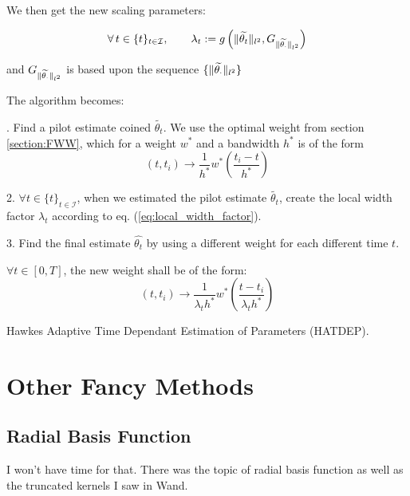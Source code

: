 \documentclass[11pt]{book}
\newcommand{\sequencetime}{\{t\}_{t \in \mathcal I} }
\begin{document}
We then get the new scaling parameters:


\begin{equation}
\forall t \in \sequencetime, \qquad \lambda_{t} :=  
g \left (\norm{\widetilde{\theta_{t}}}_{l^2}, 
G_{\norm{\widetilde{\theta_{\cdot}}}_{l^2}} \right)   
\end{equation}

and  $ G_{\lVert \widetilde{\theta_{\cdot}}\rVert_{l^2}} $ is based upon the sequence $\{ \lVert \widetilde{\theta_{\cdot}}\rVert_{l^2} \} $


The algorithm becomes:


\begin{algorithm}[H]
\label{algo:adaptive2}
. \quad Find a pilot estimate coined $\widetilde{\theta_t}$. We use the optimal weight from section \ref{section:FWW}, which for a weight $w^*$ and a bandwidth $h^*$ is of the form  $$ (t, t_i) \to \frac 1 {h^*} w^* \left ( \frac{t_i - t }{h^*} \right ) $$ 

2. \quad $\forall t \in \sequencetime$, when we estimated the pilot estimate $\widetilde{\theta_t}$, create the local width factor $\lambda_t$ according to eq. (\ref{eq:local_width_factor}). 

3. \quad Find the final estimate $\hat{\theta_t}$ by using a different weight for each different time $t$. 

$\forall t \in [0,T]$, the new weight shall be of the form:
$$ (t, t_i) \to \frac 1 {\lambda_{t} h^*} w^* \left ( \frac{t - t_i}{\lambda_{t} h^*} \right )$$ 
\caption{Hawkes Adaptive Time Dependant Estimation of Parameters (HATDEP).}
\end{algorithm}


\section{Other Fancy Methods}
\subsection{Radial Basis Function}

I won't have time for that. There was the topic of radial basis function as well as the truncated kernels I saw in Wand. 



\end{document}
